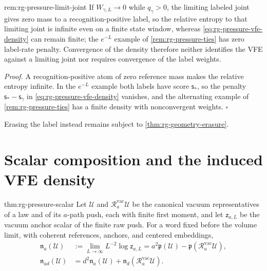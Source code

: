 {rem:rg-pressure-limit-joint}
If $W_{\gamma,L}\to0$ while $q_\gamma>0$, the limiting labeled joint gives
zero mass to a recognition-positive label, so the relative entropy to that
limiting joint is infinite even on a finite state window, whereas
\cref{eq:rg-pressure-vfe-density} can remain finite; the $e^{-L}$ example of
\cref{rem:rg-pressure-ties} has zero label-rate penalty. Convergence of the
density therefore neither identifies the VFE against a limiting joint nor
requires convergence of the label weights. 

\noindent\emph{Proof.}
A recognition-positive atom of zero reference mass makes the relative entropy
infinite. In the $e^{-L}$ example both labels have score $\mathsf s_*$, so
the penalty $\mathsf s_*-\mathsf s_\gamma$ in
\cref{eq:rg-pressure-vfe-density} vanishes, and the alternating example of
\cref{rem:rg-pressure-ties} has a finite density with nonconvergent
weights. $\square$

Erasing the label instead remains subject to \cref{thm:rg-geometry-erasure}.

\section{Scalar composition and the induced VFE density}
\label{sec:rg-pressure-scalar}

{thm:rg-pressure-scalar}
Let $\mathscr U$ and $\mathscr R^{\mathrm{vac}}_a\mathscr U$ be the canonical vacuum representatives of a
law and of its $a$-path push, each with finite first moment, and let
$\mathsf z_{a,L}$ be the vacuum anchor scalar of the finite raw push. For a
word fixed before the volume limit, with coherent references, anchors, and
centered embeddings,
\begin{align}
 \mathfrak n_a(\mathscr U)&:=\lim_{L\to\infty}L^{-2}\log\mathsf z_{a,L}
        =a^2\mathfrak p(\mathscr U)-\mathfrak p(\mathscr R^{\mathrm{vac}}_a\mathscr U),
 \label{eq:rg-pressure-scalar-density}\\
 \mathfrak n_{ad}(\mathscr U)&=d^2\mathfrak n_a(\mathscr U)
                       +\mathfrak n_d(\mathscr R^{\mathrm{vac}}_a\mathscr U).
 \label{eq:rg-pressure-scalar-word}
\end{align}

